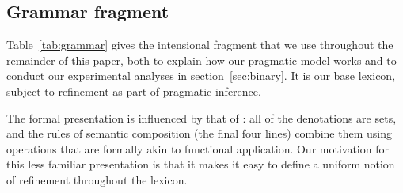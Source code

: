 \documentclass[leqno,12pt]{article}
\newcommand{\secref}[1]{section~\ref{#1}}
\newcommand{\Tabref}[1]{Table~\ref{#1}}
\begin{document}
{\subsection{Grammar fragment}\label{sec:grammar}

\Tabref{tab:grammar} gives the intensional fragment that we use
throughout the remainder of this paper, both to explain how our
pragmatic model works and to conduct our experimental analyses in
\secref{sec:binary}. It is our base lexicon, subject to refinement as
part of pragmatic inference.

The formal presentation is influenced by that of \citet{Muskens95}:
all of the denotations are sets, and the rules of semantic composition
(the final four lines) combine them using operations that are formally
akin to functional application. Our motivation for this less familiar
presentation is that it makes it easy to define a uniform notion of
refinement throughout the lexicon.

}
\end{document}
